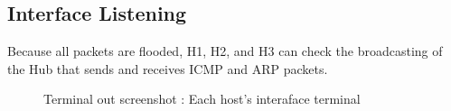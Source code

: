 \subsection{Interface Listening}
Because all packets are flooded, H1, H2, and H3 can check the broadcasting of the Hub that sends and receives ICMP and ARP packets.\\
\vspace{-4mm}
\begin{figure}[h!]
\centering
{}
\caption{Terminal out screenshot : Each host's interaface terminal}
\end{figure}

